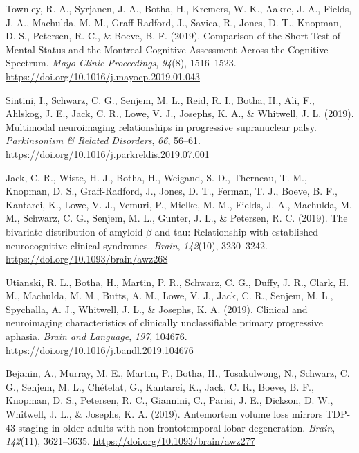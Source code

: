 \documentclass[11pt, a4paper]{awesome-cv}
\begin{document}
\leavevmode\hypertarget{ref-townley_comparison_2019}{}%
Townley, R. A., Syrjanen, J. A., Botha, H., Kremers, W. K., Aakre, J.
A., Fields, J. A., Machulda, M. M., Graff-Radford, J., Savica, R.,
Jones, D. T., Knopman, D. S., Petersen, R. C., \& Boeve, B. F. (2019).
Comparison of the {Short} {Test} of {Mental} {Status} and the {Montreal}
{Cognitive} {Assessment} {Across} the {Cognitive} {Spectrum}. \emph{Mayo
Clinic Proceedings}, \emph{94}(8), 1516--1523.
\url{https://doi.org/10.1016/j.mayocp.2019.01.043}

\leavevmode\hypertarget{ref-sintini_multimodal_2019}{}%
Sintini, I., Schwarz, C. G., Senjem, M. L., Reid, R. I., Botha, H., Ali,
F., Ahlskog, J. E., Jack, C. R., Lowe, V. J., Josephs, K. A., \&
Whitwell, J. L. (2019). Multimodal neuroimaging relationships in
progressive supranuclear palsy. \emph{Parkinsonism \& Related
Disorders}, \emph{66}, 56--61.
\url{https://doi.org/10.1016/j.parkreldis.2019.07.001}

\leavevmode\hypertarget{ref-jack_bivariate_2019}{}%
Jack, C. R., Wiste, H. J., Botha, H., Weigand, S. D., Therneau, T. M.,
Knopman, D. S., Graff-Radford, J., Jones, D. T., Ferman, T. J., Boeve,
B. F., Kantarci, K., Lowe, V. J., Vemuri, P., Mielke, M. M., Fields, J.
A., Machulda, M. M., Schwarz, C. G., Senjem, M. L., Gunter, J. L., \&
Petersen, R. C. (2019). The bivariate distribution of amyloid-\(\beta\)
and tau: Relationship with established neurocognitive clinical
syndromes. \emph{Brain}, \emph{142}(10), 3230--3242.
\url{https://doi.org/10.1093/brain/awz268}

\leavevmode\hypertarget{ref-utianski_clinical_2019}{}%
Utianski, R. L., Botha, H., Martin, P. R., Schwarz, C. G., Duffy, J. R.,
Clark, H. M., Machulda, M. M., Butts, A. M., Lowe, V. J., Jack, C. R.,
Senjem, M. L., Spychalla, A. J., Whitwell, J. L., \& Josephs, K. A.
(2019). Clinical and neuroimaging characteristics of clinically
unclassifiable primary progressive aphasia. \emph{Brain and Language},
\emph{197}, 104676. \url{https://doi.org/10.1016/j.bandl.2019.104676}

\leavevmode\hypertarget{ref-bejanin_antemortem_2019}{}%
Bejanin, A., Murray, M. E., Martin, P., Botha, H., Tosakulwong, N.,
Schwarz, C. G., Senjem, M. L., Chételat, G., Kantarci, K., Jack, C. R.,
Boeve, B. F., Knopman, D. S., Petersen, R. C., Giannini, C., Parisi, J.
E., Dickson, D. W., Whitwell, J. L., \& Josephs, K. A. (2019).
Antemortem volume loss mirrors {TDP}-43 staging in older adults with
non-frontotemporal lobar degeneration. \emph{Brain}, \emph{142}(11),
3621--3635. \url{https://doi.org/10.1093/brain/awz277}
\end{document}
